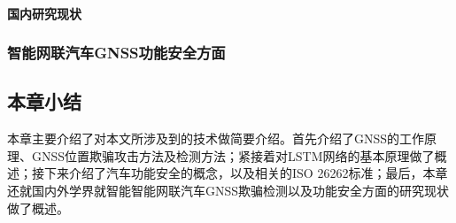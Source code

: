 \paragraph{国内研究现状}
\label{GNSS_guonei}

\subsubsection{智能网联汽车GNSS功能安全方面}
\subsection{本章小结}
本章主要介绍了对本文所涉及到的技术做简要介绍。首先介绍了GNSS的工作原理、GNSS位置欺骗攻击方法及检测方法；紧接着对LSTM网络的基本原理做了概述；接下来介绍了汽车功能安全的概念，以及相关的ISO 26262标准；最后，本章还就国内外学界就智能智能网联汽车GNSS欺骗检测以及功能安全方面的研究现状做了概述。
